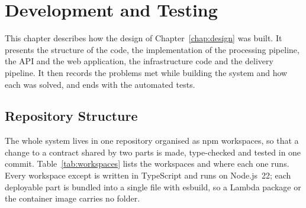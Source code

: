 \chapter{Development and Testing}
\label{chap:implementation}

This chapter describes how the design of Chapter~\ref{chap:design} was built. It presents the
structure of the code, the implementation of the processing pipeline, the API and the web
application, the infrastructure code and the delivery pipeline. It then records the problems met
while building the system and how each was solved, and ends with the automated tests.

\section{Repository Structure}
\label{sec:repo-structure}

The whole system lives in one repository organised as npm workspaces, so that a change to a
contract shared by two parts is made, type-checked and tested in one commit.
Table~\ref{tab:workspaces} lists the workspaces and where each one runs. Every workspace except
 is written in TypeScript and runs on Node.js~22; each deployable part is bundled into
a single file with esbuild, so a Lambda package or the container image carries no
 folder.


